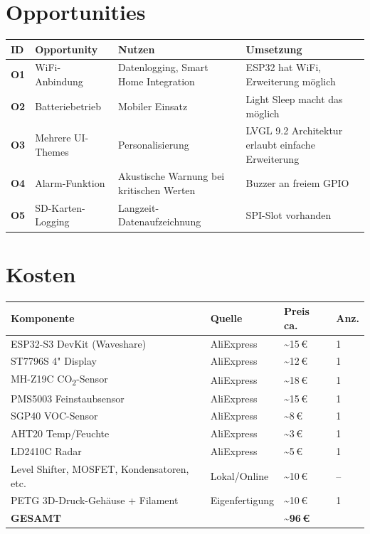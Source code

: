 \documentclass[a4paper,11pt]{article}
\begin{document}
\section{Opportunities}

\begin{longtable}{p{0.8cm} p{3cm} p{4.5cm} p{4.5cm}}
\toprule
\rowcolor{tableheader}
\textbf{ID} & \textbf{Opportunity} & \textbf{Nutzen} & \textbf{Umsetzung} \\
\midrule
\endhead
\textbf{O1} & WiFi-Anbindung & Datenlogging, Smart Home Integration & ESP32 hat WiFi, Erweiterung möglich \\
\midrule
\textbf{O2} & Batteriebetrieb & Mobiler Einsatz & Light Sleep macht das möglich \\
\midrule
\textbf{O3} & Mehrere UI-Themes & Personalisierung & LVGL 9.2 Architektur erlaubt einfache Erweiterung \\
\midrule
\textbf{O4} & Alarm-Funktion & Akustische Warnung bei kritischen Werten & Buzzer an freiem GPIO \\
\midrule
\textbf{O5} & SD-Karten-Logging & Langzeit-Datenaufzeichnung & SPI-Slot vorhanden \\
\bottomrule
\end{longtable}

\section{Kosten}

\begin{longtable}{p{5.5cm} p{3cm} p{2cm} p{2cm}}
\toprule
\rowcolor{tableheader}
\textbf{Komponente} & \textbf{Quelle} & \textbf{Preis ca.} & \textbf{Anz.} \\
\midrule
\endhead
ESP32-S3 DevKit (Waveshare) & AliExpress & \textasciitilde15\,\euro{} & 1 \\
ST7796S 4" Display          & AliExpress & \textasciitilde12\,\euro{} & 1 \\
MH-Z19C CO\textsubscript{2}-Sensor & AliExpress & \textasciitilde18\,\euro{} & 1 \\
PMS5003 Feinstaubsensor     & AliExpress & \textasciitilde15\,\euro{} & 1 \\
SGP40 VOC-Sensor            & AliExpress & \textasciitilde8\,\euro{} & 1 \\
AHT20 Temp/Feuchte          & AliExpress & \textasciitilde3\,\euro{} & 1 \\
LD2410C Radar               & AliExpress & \textasciitilde5\,\euro{} & 1 \\
Level Shifter, MOSFET, Kondensatoren, etc. & Lokal/Online & \textasciitilde10\,\euro{} & -- \\
PETG 3D-Druck-Gehäuse + Filament & Eigenfertigung & \textasciitilde10\,\euro{} & 1 \\
\midrule
\textbf{GESAMT} & & \textbf{\textasciitilde96\,\euro{}} & \\
\bottomrule
\end{longtable}
\end{document}
